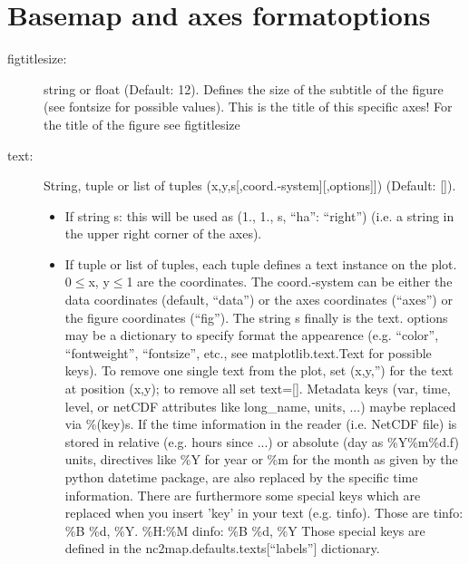 \section{Basemap and axes formatoptions}
\begin{description}
    \item[\gls*{figtitlesize}:] \label{item:figtitlesize}  string or float (Default: 12). Defines the size of the subtitle of the figure (see fontsize for possible values). This is the title of this specific axes! For the title of the figure see figtitlesize
    \item[\gls*{text}:] \label{item:text}  String, tuple or list of tuples (x,y,s[,coord.-system][,options]]) (Default: []).
\begin{itemize}
    \item If string s: this will be used as (1., 1., s, {\enquote{ha}: \enquote{right}}) (i.e. a string in the upper right corner of the axes).
    \item If tuple or list of tuples, each tuple defines a text instance on the plot. 0$\leq$x, y$\leq$1 are the coordinates. The coord.-system can be either the data coordinates (default, \enquote{data}) or the axes coordinates (\enquote{axes}) or the figure coordinates (\enquote{fig}). The string s finally is the text. options may be a dictionary to specify format the appearence (e.g. \enquote{color}, \enquote{fontweight}, \enquote{fontsize}, etc., see matplotlib.text.Text for possible keys). To remove one single text from the plot, set (x,y,'') for the text at position (x,y); to remove all set text=[]. Metadata keys (var, time, level, or netCDF attributes like long\_name, units, ...) maybe replaced via \%(key)s. If the time information in the reader (i.e. NetCDF file) is stored in relative (e.g. hours since ...) or absolute (day as \%Y\%m\%d.f) units, directives like \%Y for year or \%m for the month as given by the python datetime package, are also replaced by the specific time information. There are furthermore some special keys which are replaced when you insert '{key}' in your text (e.g. {tinfo}). Those are tinfo: \%B \%d, \%Y. \%H:\%M dinfo: \%B \%d, \%Y Those special keys are defined in the nc2map.defaults.texts[\enquote{labels}] dictionary.
\end{itemize}


\end{description}
